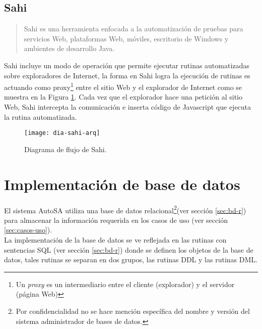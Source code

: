 \subsection{Sahi}\label{sec:sahi}
\begin{quote}
	Sahi es una herramienta enfocada a la automatización de pruebas para servicios Web, plataformas Web, móviles, escritorio de Windows\textsuperscript{\textcopyright} y ambientes de desarrollo Java\cite{SahiPro}.
\end{quote}

Sahi incluye un modo de operación que permite ejecutar rutinas automatizadas sobre exploradores de Internet, la forma en Sahi logra la ejecución de rutinas es actuando como proxy\footnote{Un \textit{proxy} es un intermediario entre el cliente (explorador) y el servidor (página Web)\cite{BeginningUbuntuLinux}} entre el sitio Web y el explorador de Internet como se muestra en la Figura \ref{fig:dia-sahi-arq}. Cada vez que el explorador hace una petición al sitio Web, Sahi intercepta la comunicación e inserta código de Javascript que ejecuta la rutina automatizada\cite{WebEng9IntConf, SahiPro}.

\begin{figure}[h]
\centering
\texttt{[image: dia-sahi-arq]}
\caption{Diagrama de flujo de Sahi\cite{SahiPro}.}
\label{fig:dia-sahi-arq}
\end{figure}

%

\section{Implementación de base de datos}\label{sec:impl-db}
El sistema AutoSA utiliza una base de datos relacional\footnote{Por confidencialidad no se hace mención específica del nombre y versión del sistema administrador de bases de datos.}(ver sección \ref{sec:bd-r}) para almacenar la información requerida en los casos de uso (ver sección \ref{sec:casos-uso}).\\
La implementación de la base de datos se ve reflejada en las rutinas con sentencias SQL (ver sección \ref{sec:bd-r}) donde se definen los objetos de la base de datos, tales rutinas se separan en dos grupos, las rutinas DDL y las rutinas DML.

